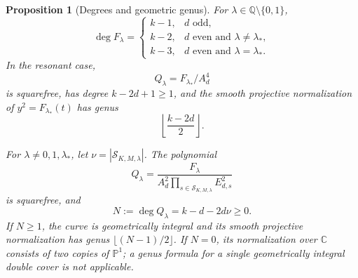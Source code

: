 \documentclass[11pt,a4paper]{article}
\newtheorem{proposition}[theorem]{Proposition}
\theoremstyle{definition}
\theoremstyle{remark}
\begin{document}
\begin{proposition}[Degrees and geometric genus]\label{iw:geometry}
For \(\lambda\in\mathbb Q\setminus\{0,1\}\),
\begin{equation}\label{iw:degree-F}
 \deg F_\lambda=
 \begin{cases}
 k-1,&d\text{ odd},\\
 k-2,&d\text{ even and }\lambda\ne\lambda_*,\\
 k-3,&d\text{ even and }\lambda=\lambda_*.
 \end{cases}
\end{equation}
In the resonant case,
\[
 Q_\lambda=F_{\lambda_*}/A_d^4
\]
is squarefree, has degree \(k-2d+1\ge1\), and the smooth
projective normalization of \(y^2=F_{\lambda_*}(t)\) has genus
\begin{equation}\label{iw:resonant-genus}
 \left\lfloor\frac{k-2d}{2}\right\rfloor.
\end{equation}

For \(\lambda\ne0,1,\lambda_*\), let
\(\nu=|\mathcal S_{K,M,\lambda}|\). The polynomial
\begin{equation}\label{iw:squarefree-model}
 Q_\lambda=
 \frac{F_\lambda}
 {A_d^2\prod_{s\in\mathcal S_{K,M,\lambda}}E_{d,s}^2}
\end{equation}
is squarefree, and
\begin{equation}\label{iw:general-branch-degree}
 N:=\deg Q_\lambda=k-d-2d\nu\ge0.
\end{equation}
If \(N\ge1\), the curve is geometrically integral and its
smooth projective normalization has genus
\(\lfloor(N-1)/2\rfloor\).
If \(N=0\), its normalization over \(\mathbb C\) consists
of two copies of \(\mathbb P^1\); a genus formula for a single
geometrically integral double cover is not applicable.
\end{proposition}
\end{document}
